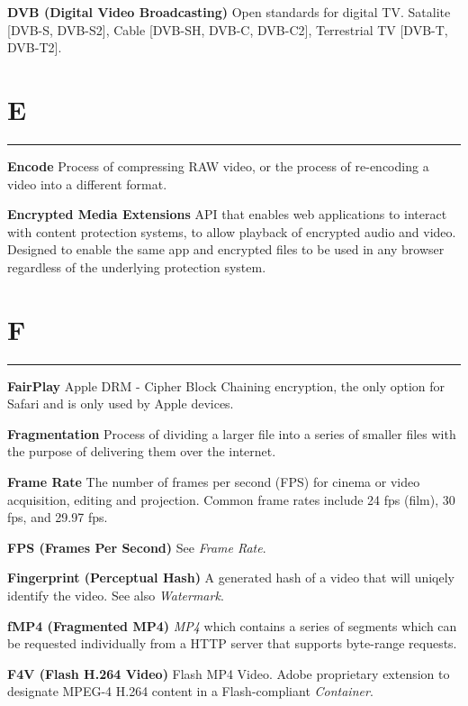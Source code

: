 \smallskip
\textbf{DVB (Digital Video Broadcasting)}
Open standards for digital TV.  Satalite [DVB-S, DVB-S2], Cable [DVB-SH, DVB-C, DVB-C2], Terrestrial TV [DVB-T, DVB-T2].

\section{E}
\hrule

\medskip
\textbf{Encode}
Process of compressing RAW video, or the process of re-encoding a video into a different format.

\smallskip
\textbf{Encrypted Media Extensions}
API that enables web applications to interact with content protection systems, to allow playback of encrypted audio and video. Designed to enable the same app and encrypted files to be used in any browser regardless of the underlying protection system.

\section{F}
\hrule

\medskip
\textbf{FairPlay}
Apple DRM - Cipher Block Chaining encryption, the only option for Safari and is only used by Apple devices.

\smallskip
\textbf{Fragmentation}
Process of dividing a larger file into a series of smaller files with the purpose of delivering them over the internet.

\textbf{Frame Rate}
The number of frames per second (FPS) for cinema or video acquisition, editing and projection. Common frame rates include 24 fps (film), 30 fps, and 29.97 fps.

\textbf{FPS (Frames Per Second)}
See \textit{Frame Rate}.

\smallskip
\textbf{Fingerprint (Perceptual Hash)}
A generated hash of a video that will uniqely identify the video. See also \textit{Watermark}.

\smallskip
\textbf{fMP4 (Fragmented MP4)}
\textit{MP4} which contains a series of segments which can be requested individually from a HTTP server that supports byte-range requests.

\smallskip
\textbf{F4V (Flash H.264 Video)}
Flash MP4 Video.  Adobe proprietary extension to designate MPEG-4 H.264 content in a Flash-compliant \textit{Container}.

